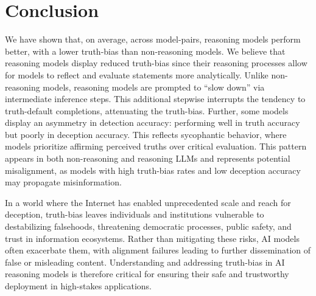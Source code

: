 \documentclass{article}
\begin{document}
\section{Conclusion}
\label{sec:conclusion}

We have shown that, on average, across model-pairs, reasoning models perform better, with a lower truth-bias than non-reasoning models. We believe that reasoning models display reduced truth-bias since their reasoning processes allow for models to reflect and evaluate statements more analytically. Unlike non-reasoning models, reasoning models are prompted to ``slow down'' via intermediate inference steps. This additional stepwise interrupts the tendency to truth-default completions, attenuating the truth-bias. Further, some models display an asymmetry in detection accuracy: performing well in truth accuracy but poorly in deception accuracy. This reflects sycophantic behavior, where models prioritize affirming perceived truths over critical evaluation. This pattern appears in both non-reasoning and reasoning LLMs and represents potential misalignment, as models with high truth-bias rates and low deception accuracy may propagate misinformation.

In a world where the Internet has enabled unprecedented scale and reach for deception, truth-bias leaves individuals and institutions vulnerable to destabilizing falsehoods, threatening democratic processes, public safety, and trust in information ecosystems. Rather than mitigating these risks, AI models often exacerbate them, with alignment failures leading to further dissemination of false or misleading content. Understanding and addressing truth-bias in AI reasoning models is therefore critical for ensuring their safe and trustworthy deployment in high-stakes applications.



\newpage
\appendix
\end{document}
